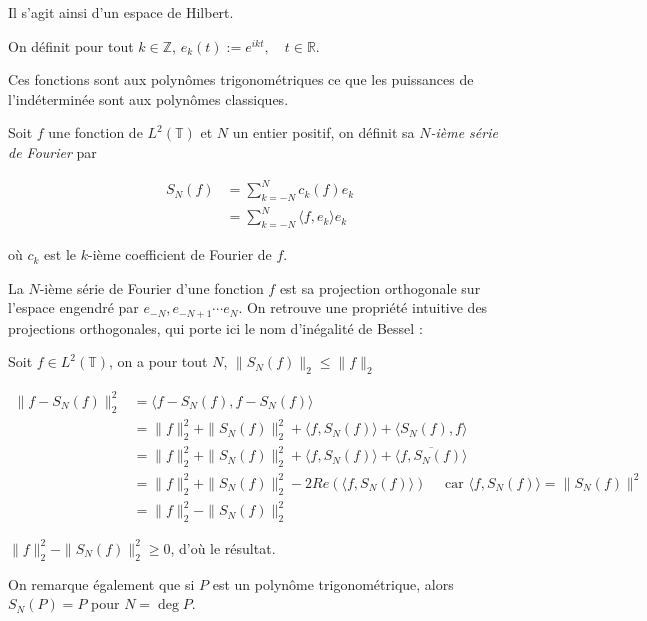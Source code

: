 		 Il s'agit ainsi d'un espace de Hilbert.
		 
		\begin{mydef}
			On définit pour tout $k \in \mathbb{Z}$,  $e_k(t):=e^{ikt}, \quad t\in \mathbb{R}.$	
		\end{mydef}
		
		Ces fonctions sont aux polynômes trigonométriques ce que les puissances de l'indéterminée sont aux polynômes classiques.
		
		\begin{mydef}
			Soit $f$ une fonction de $L^2(\mathbb{T})$ et $N$ un entier positif, on définit sa \textit{$N$-ième série de Fourier} par
			
			\begin{align*}
				S_N(f) &= \sum_{k = -N}^N c_k(f) e_k \\
				&= \sum_{k = -N}^N \langle f, e_k \rangle e_k
			\end{align*}
			
			où $c_k$ est le $k$-ième coefficient de Fourier de $f$.
		\end{mydef}

		La $N$-ième série de Fourier d'une fonction $f$ est sa projection orthogonale sur l'espace engendré par $e_{-N}, e_{-N+1} \cdots e_N$. On retrouve une propriété intuitive des projections orthogonales, qui porte ici le nom d'inégalité de Bessel :
		
		\begin{mythm}
			Soit $f \in L^2(\mathbb{T})$, on a pour tout $N$, $\|S_N(f)\|_2 \leqslant \|f\|_2$
		\end{mythm}
		
		\begin{myproof}
			\begin{align*}
				\| f - S_N(f) \|^2_2 &= \langle f - S_N(f), f -S_N(f) \rangle \\
									 & = \| f \|^2_2 + \| S_N(f)\|^2_2 + \langle f, S_N(f) \rangle + \langle S_N(f), f \rangle \\ 
									 & = \| f \|^2_2 + \| S_N(f)\|^2_2 + \langle f, S_N(f) \rangle + \overline {\langle  f, S_N(f)\rangle } \\
									 &= \| f \|^2_2 + \| S_N(f)\|^2_2 - 2Re (\langle f, S_N(f) \rangle) \quad \text{ car } \langle f, S_N(f) \rangle = \| S_N(f)\|^2 \\
									 &=  \| f \|^2_2 - \| S_N(f)\|^2_2
			\end{align*}
			
			$\| f \|^2_2 - \| S_N(f)\|^2_2 \geqslant 0$, d'où le résultat.
			\cqfd
		\end{myproof}
			On remarque également que si $P$ est un polynôme trigonométrique, alors $S_N(P) = P$ pour $N = \deg P$. 
			
